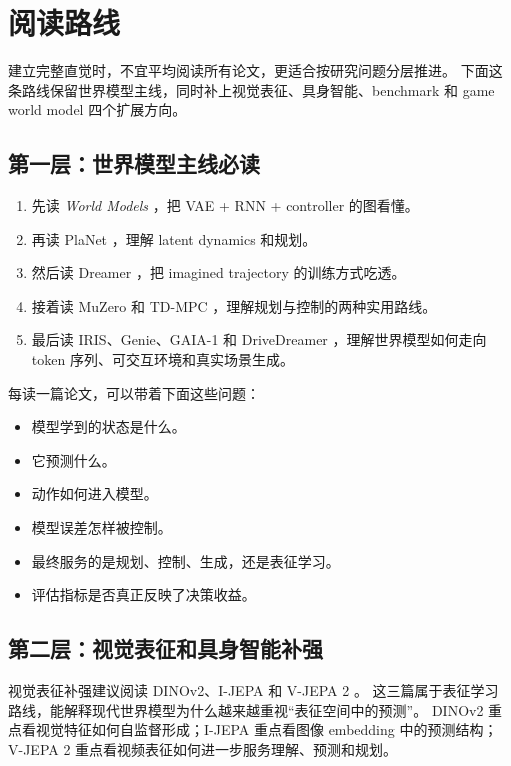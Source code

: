 \documentclass[11pt,a4paper]{ctexart}
\begin{document}
\section{阅读路线}

建立完整直觉时，不宜平均阅读所有论文，更适合按研究问题分层推进。
下面这条路线保留世界模型主线，同时补上视觉表征、具身智能、benchmark 和 game world model 四个扩展方向。

\subsection{第一层：世界模型主线必读}

\begin{enumerate}
  \item 先读 \emph{World Models} \cite{ha2018worldmodels}，把 VAE + RNN + controller 的图看懂。
  \item 再读 PlaNet \cite{hafner2019planet}，理解 latent dynamics 和规划。
  \item 然后读 Dreamer \cite{hafner2020dreamer}，把 imagined trajectory 的训练方式吃透。
  \item 接着读 MuZero \cite{schrittwieser2020muzero} 和 TD-MPC \cite{hansen2022tdmpc}，理解规划与控制的两种实用路线。
  \item 最后读 IRIS、Genie、GAIA-1 和 DriveDreamer \cite{micheli2022iris,bruce2024genie,hu2023gaia,wang2023drivedreamer}，理解世界模型如何走向 token 序列、可交互环境和真实场景生成。
\end{enumerate}

每读一篇论文，可以带着下面这些问题：

\begin{itemize}
  \item 模型学到的状态是什么。
  \item 它预测什么。
  \item 动作如何进入模型。
  \item 模型误差怎样被控制。
  \item 最终服务的是规划、控制、生成，还是表征学习。
  \item 评估指标是否真正反映了决策收益。
\end{itemize}

\subsection{第二层：视觉表征和具身智能补强}

视觉表征补强建议阅读 DINOv2、I-JEPA 和 V-JEPA 2 \cite{oquab2023dinov2,assran2023ijepa,assran2025vjepa2}。
这三篇属于表征学习路线，能解释现代世界模型为什么越来越重视“表征空间中的预测”。
DINOv2 重点看视觉特征如何自监督形成；I-JEPA 重点看图像 embedding 中的预测结构；V-JEPA 2 重点看视频表征如何进一步服务理解、预测和规划。
\end{document}

